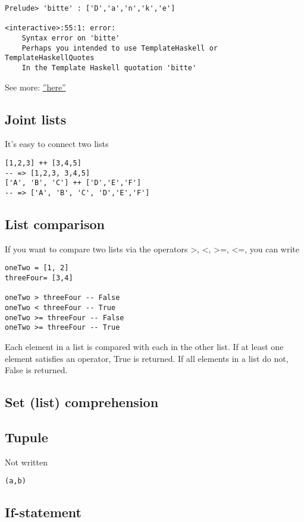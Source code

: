 \begin{lstlisting}
Prelude> 'bitte' : ['D','a','n','k','e']

<interactive>:55:1: error:
    Syntax error on 'bitte'
    Perhaps you intended to use TemplateHaskell or TemplateHaskellQuotes
    In the Template Haskell quotation 'bitte'
\end{lstlisting}

See more: \href{https://wiki.haskell.org/Learn_Haskell_in_10_minutes#Simple_types}{''here''}

\subsection{Joint lists}
It’s easy to connect two lists
\begin{lstlisting}
[1,2,3] ++ [3,4,5]
-- => [1,2,3, 3,4,5]
['A', 'B', 'C'] ++ ['D','E','F']
-- => ['A', 'B', 'C', 'D','E','F']
\end{lstlisting}

\subsection{List comparison}
If you want to compare two lists via the operators >, <, >=, <=, you can write 
\begin{lstlisting}
oneTwo = [1, 2]
threeFour= [3,4]

oneTwo > threeFour -- False
oneTwo < threeFour -- True
oneTwo >= threeFour -- False
oneTwo >= threeFour -- True
\end{lstlisting}

Each element in a list is compared with each in the other list. If at least one element satisfies an operator, True is returned. If all elements in a list do not, False is returned. 

\subsection{Set (list) comprehension}

\subsection{Tupule}
Not written 
\begin{lstlisting}
(a,b)
\end{lstlisting}

\subsection{If-statement}

